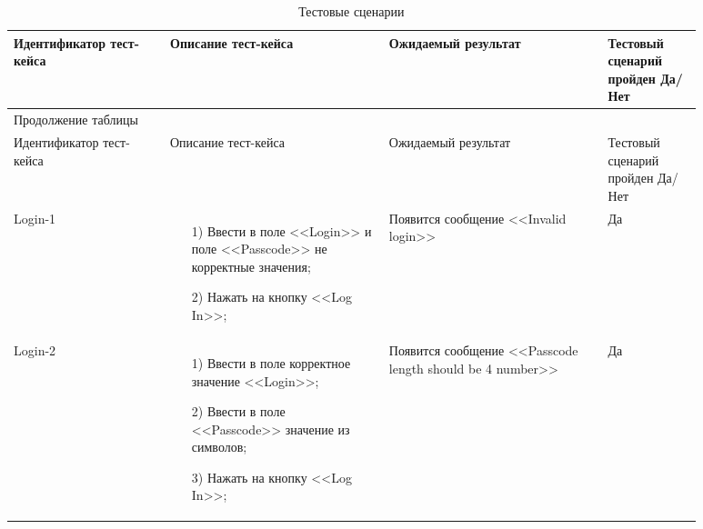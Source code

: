   \begin{longtable}{| >{\raggedright}p{0.20\linewidth} 
                  | >{\raggedright}p{0.28\linewidth} 
                  | >{\raggedright}p{0.28\linewidth} 
                  | >{\raggedright\arraybackslash}p{0.12\linewidth}|}
   \caption{Тестовые сценарии} \label{tab:long} \\

   \hline
   Идентификатор тест-кейса & Описание тест-кейса & Ожидаемый результат & Тестовый сценарий пройден Да/Нет \\
   \endfirsthead

\multicolumn{4}{c}%
{{\raggedright Продолжение таблицы \thetable{}}} \\
\hline
   Идентификатор тест-кейса & Описание тест-кейса & Ожидаемый результат & Тестовый сценарий пройден Да/Нет \\
\endhead
   \hline
   Login-1 & \begin{enumerate} \item[1)] Ввести в поле <<Login>> и поле <<Passcode>> не корректные значения;
				\item[2)] Нажать на кнопку <<Log In>>;
			\end{enumerate}
   			 & Появится сообщение <<Invalid login>> & Да \\

   \hline
   Login-2 & \begin{enumerate} \item[1)] Ввести в поле корректное значение <<Login>>;
				\item[2)] Ввести в поле <<Passcode>> значение из символов;
				\item[3)] Нажать на кнопку <<Log In>>;
			\end{enumerate}
			& Появится сообщение <<Passcode length should be 4 number>> & Да \\


\end{longtable}
